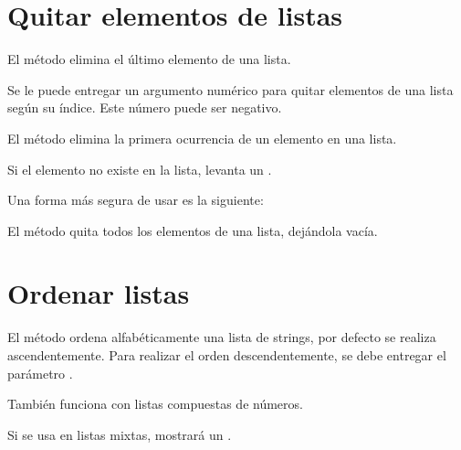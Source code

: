 
\section{Quitar elementos de listas}

El método  elimina el último elemento de una lista.
  

Se le puede entregar un argumento numérico para quitar elementos de una lista según su índice. Este número puede ser negativo.


El método  elimina la primera ocurrencia de un elemento en una lista.
  

Si el elemento no existe en la lista, levanta un .


Una forma más segura de usar  es la siguiente:


El método  quita todos los elementos de una lista, dejándola vacía.


\section{Ordenar listas}

El método  ordena alfabéticamente una lista de strings, por defecto se realiza ascendentemente. Para realizar el orden descendentemente, se debe entregar el parámetro .
  
  
También funciona con listas compuestas de números.


Si se usa en listas mixtas, mostrará un .

